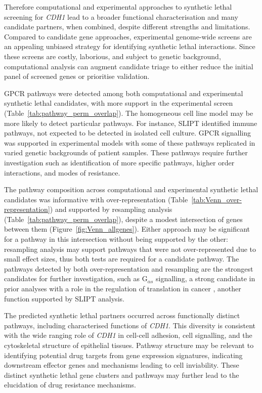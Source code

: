 Therefore computational and experimental approaches to synthetic lethal screening for \textit{CDH1} lead to a broader functional characterisation and many candidate partners, when combined, despite different strengths and limitations. Compared to candidate gene approaches, experimental genome-wide screens are an appealing unbiased strategy for identifying synthetic lethal interactions. Since these screens are costly, laborious, and subject to genetic background, computational analysis can augment candidate triage to either reduce the initial panel of screened genes or prioritise validation.

GPCR pathways were detected among both computational and experimental synthetic lethal candidates, with more support in the experimental screen (Table~\ref{tab:pathway_perm_overlap}). The homogeneous cell line model may be more likely to detect particular pathways. For instance, \gls{SLIPT} identified immune pathways, not expected to be detected in isolated cell culture. GPCR signalling was supported in experimental models \cite{Telford2015} with some of these pathways replicated in varied genetic backgrounds of patient samples. These pathways require further investigation such as identification of more specific pathways, higher order interactions, and modes of resistance.

The pathway composition across computational and experimental synthetic lethal candidates was informative with over-represent\-ation (Table~\ref{tab:Venn_over-representation}) and supported by resampling analysis (Table~\ref{tab:pathway_perm_overlap}), despite a modest intersection of genes between them (Figure~\ref{fig:Venn_allgenes}).
Either approach may be significant for a pathway in this intersection without being supported by the other: resampling analysis may support pathways that were not over-represent\-ed due to small effect sizes, thus both tests are required for a candidate pathway.
The pathways detected by both over-represent\-ation and resampling are the strongest candidates for further investigation, such as G$_{\alpha s}$ signalling, a strong candidate in prior analyses with a role in the regulation of translation in cancer \cite{Gao2015}, another function supported by \gls{SLIPT} analysis.

The predicted synthetic lethal partners occurred across functionally distinct pathways, including characterised functions of \textit{CDH1}. This diversity is consistent with the wide ranging role of \textit{CDH1} in cell-cell adhesion, cell signalling, and the cytoskeletal structure of epithelial tissues. Pathway structure may be relevant to identifying potential drug targets from gene expression signatures, indicating downstream effector genes and mechanisms leading to cell inviability. These distinct synthetic lethal gene clusters and pathways may further lead to the elucidation of drug resistance mechanisms.

